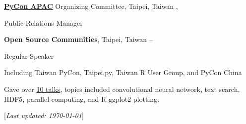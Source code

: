 \documentclass[a4paper,12pt,oneside]{article}
\newcommand{\CVNote}{Last updated: {\today}}
\begin{document}
\begin{body}
\EntryGapNoBreak
\href{http://pycon.tw}{\textbf{PyCon APAC}} Organizing Committee, Taipei, Taiwan
\hfill
{},
\par
Public Relations Manager

\BigEntryGapNoBreak
\textbf{Open Source Communities}, Taipei, Taiwan
\hfill
{} --
\par
Regular Speaker
\begin{detail}
    \begin{detailitem}
    \item Including Taiwan PyCon, Taipei.py, Taiwan R User Group, and PyCon China
    \item Gave over \href{http://blog.liang2.tw/talks/#talks}{10 talks}, topics included
        convolutional neural network, text search,
        HDF5, parallel computing, and R ggplot2 plotting.
    \end{detailitem}
\end{detail}

%
%
%
%
\end{body}


\begin{flushright}
\scriptsize%
[\textit{\CVNote}]%
\hspace{2.0mm}\null
\end{flushright}

\label{LastPage}
\end{document}
